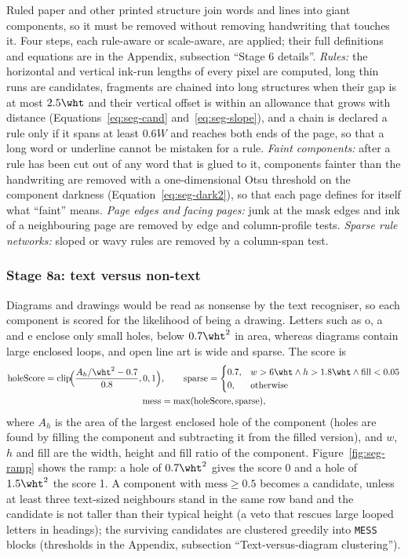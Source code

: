 Ruled paper and other printed structure join words and lines into giant components, so it must be removed without removing handwriting that touches it.
Four steps, each rule-aware or scale-aware, are applied; their full definitions and equations are in the Appendix, subsection ``Stage 6 details''.
\emph{Rules:} the horizontal and vertical ink-run lengths of every pixel are computed, long thin runs are candidates, fragments are chained into long structures when their gap is at most $2.5\wht$ and their vertical offset is within an allowance that grows with distance (Equations~\ref{eq:seg-cand} and~\ref{eq:seg-slope}), and a chain is declared a rule only if it spans at least $0.6W$ and reaches both ends of the page, so that a long word or underline cannot be mistaken for a rule.
\emph{Faint components:} after a rule has been cut out of any word that is glued to it, components fainter than the handwriting are removed with a one-dimensional Otsu threshold on the component darkness (Equation~\ref{eq:seg-dark2}), so that each page defines for itself what ``faint'' means.
\emph{Page edges and facing pages:} junk at the mask edges and ink of a neighbouring page are removed by edge and column-profile tests.
\emph{Sparse rule networks:} sloped or wavy rules are removed by a column-span test.

\subsubsection{Stage 8a: text versus non-text}

Diagrams and drawings would be read as nonsense by the text recogniser, so each component is scored for the likelihood of being a drawing.
Letters such as o, a and e enclose only small holes, below $0.7\wht^2$ in area, whereas diagrams contain large enclosed loops, and open line art is wide and sparse.
The score is
\begin{equation}
\begin{gathered}
\mathrm{holeScore}=\mathrm{clip}\!\Bigl(\frac{A_h/\wht^2-0.7}{0.8},0,1\Bigr),\qquad
\mathrm{sparse}=\begin{cases}0.7,&w>6\wht\wedge h>1.8\wht\wedge\mathrm{fill}<0.05\\0,&\text{otherwise}\end{cases}\\
\mathrm{mess}=\max(\mathrm{holeScore},\mathrm{sparse}),
\end{gathered}
\label{eq:seg-mess}
\end{equation}
where $A_h$ is the area of the largest enclosed hole of the component (holes are found by filling the component and subtracting it from the filled version), and $w$, $h$ and fill are the width, height and fill ratio of the component.
Figure~\ref{fig:seg-ramp} shows the ramp: a hole of $0.7\wht^2$ gives the score 0 and a hole of $1.5\wht^2$ the score 1.
A component with $\mathrm{mess}\ge0.5$ becomes a candidate, unless at least three text-sized neighbours stand in the same row band and the candidate is not taller than their typical height (a veto that rescues large looped letters in headings); the surviving candidates are clustered greedily into \texttt{MESS} blocks (thresholds in the Appendix, subsection ``Text-versus-diagram clustering'').


